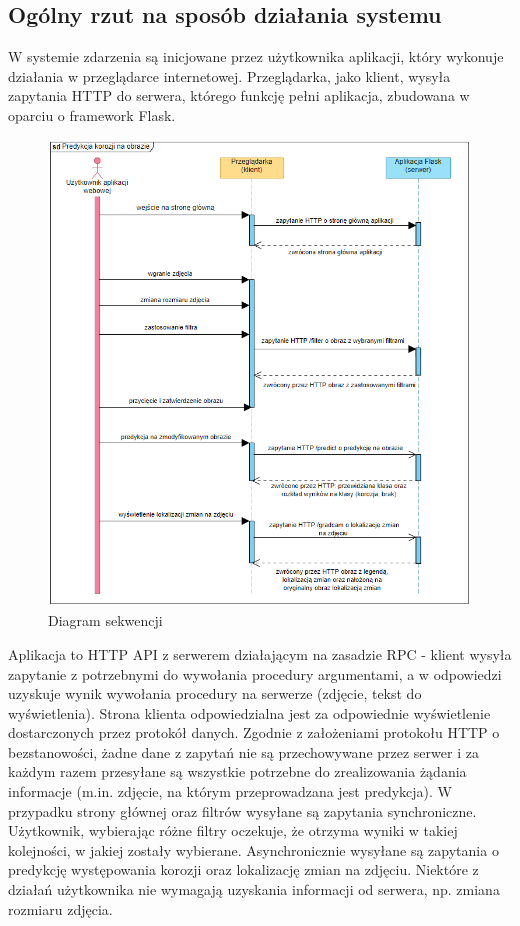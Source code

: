 \documentclass[polish,12pt]{aghthesis}
\begin{document}
\subsection{Ogólny rzut na sposób działania systemu}
W systemie zdarzenia są inicjowane przez użytkownika aplikacji, który wykonuje działania w przeglądarce internetowej. Przeglądarka, jako klient, wysyła zapytania HTTP do serwera, którego funkcję pełni aplikacja, zbudowana w oparciu o framework Flask. 

\begin{figure}[h]
    \centering
    \label{fig:sequence-diagram}    \includegraphics[width=15cm]{images/diagram_sekwencji.PNG}
    \caption{Diagram sekwencji}
\end{figure}

Aplikacja to HTTP API z serwerem działającym na zasadzie RPC - klient wysyła zapytanie z potrzebnymi do wywołania procedury argumentami, a w odpowiedzi uzyskuje wynik wywołania procedury na serwerze (zdjęcie, tekst do wyświetlenia). Strona klienta odpowiedzialna jest za odpowiednie wyświetlenie dostarczonych przez protokół danych. Zgodnie z założeniami protokołu HTTP o bezstanowości, żadne dane z zapytań nie są przechowywane przez serwer i za każdym razem przesyłane są wszystkie potrzebne do zrealizowania żądania informacje (m.in. zdjęcie, na którym przeprowadzana jest predykcja). W przypadku strony głównej oraz filtrów wysyłane są zapytania synchroniczne. Użytkownik, wybierając różne filtry oczekuje, że otrzyma wyniki w takiej kolejności, w jakiej zostały wybierane. Asynchronicznie wysyłane są zapytania o predykcję występowania korozji oraz lokalizację zmian na zdjęciu. Niektóre z działań użytkownika nie wymagają uzyskania informacji od serwera, np. zmiana rozmiaru zdjęcia.
\end{document}
